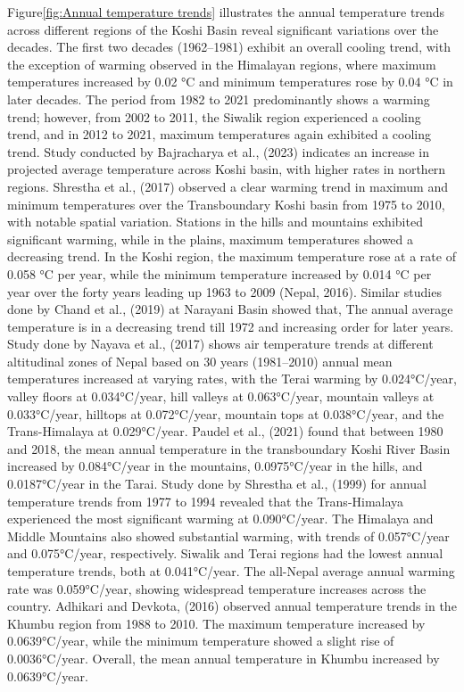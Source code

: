 Figure\ref{fig:Annual temperature trends} illustrates the annual temperature trends across different regions of the Koshi Basin reveal significant variations over the decades. The first two decades (1962--1981) exhibit an overall cooling trend, with the exception of warming observed in the Himalayan regions, where maximum temperatures increased by 0.02 °C and minimum temperatures rose by 0.04 °C in later decades. The period from 1982 to 2021 predominantly shows a warming trend; however, from 2002 to 2011, the Siwalik region experienced a cooling trend, and in 2012 to 2021, maximum temperatures again exhibited a cooling trend. Study conducted by Bajracharya et al., (2023) indicates an increase in projected average temperature across Koshi basin, with higher rates in northern regions. \citet{shrestha_observed_2017} Shrestha et al., (2017) observed a clear warming trend in maximum and minimum temperatures over the Transboundary Koshi basin from 1975 to 2010, with notable spatial variation. Stations in the hills and mountains exhibited significant warming, while in the plains, maximum temperatures showed a decreasing trend. In the Koshi region, the maximum temperature rose at a rate of 0.058 °C per year, while the minimum temperature increased by 0.014 °C per year over the forty years leading up 1963 to 2009 \citep{nepal_impacts_2016} (Nepal, 2016). Similar studies done by \citet{chand_trend_2019} Chand et al., (2019) at Narayani Basin showed that, The annual average temperature is in a decreasing trend till 1972 and increasing order for later years.  Study done by \citet{nayava_spatial_2017} Nayava et al., (2017) shows air temperature trends at different altitudinal zones of Nepal based on 30 years (1981--2010) annual mean temperatures increased at varying rates, with the Terai warming by 0.024°C/year, valley floors at 0.034°C/year, hill valleys at 0.063°C/year, mountain valleys at 0.033°C/year, hilltops at 0.072°C/year, mountain tops at 0.038°C/year, and the Trans-Himalaya at 0.029°C/year. \citet{paudel_climate_2021}Paudel et al., (2021) found that between 1980 and 2018, the mean annual temperature in the transboundary Koshi River Basin increased by 0.084°C/year in the mountains, 0.0975°C/year in the hills, and 0.0187°C/year in the Tarai. Study done by \citet{shrestha_maximum_1999} Shrestha et al., (1999) for annual temperature trends from 1977 to 1994 revealed that the Trans-Himalaya experienced the most significant warming at 0.090°C/year. The Himalaya and Middle Mountains also showed substantial warming, with trends of 0.057°C/year and 0.075°C/year, respectively. Siwalik and Terai regions had the lowest annual temperature trends, both at 0.041°C/year. The all-Nepal average annual warming rate was 0.059°C/year, showing widespread temperature increases across the country. \citet{adhikari_x_2016} Adhikari and Devkota, (2016) observed annual temperature trends in the Khumbu region from 1988 to 2010. The maximum temperature increased by 0.0639°C/year, while the minimum temperature showed a slight rise of 0.0036°C/year. Overall, the mean annual temperature in Khumbu increased by 0.0639°C/year.


